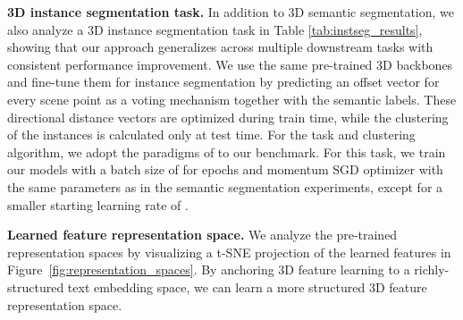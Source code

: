 \smallskip
\noindent \textbf{3D instance segmentation task.}
In addition to 3D semantic segmentation, we also analyze a 3D instance segmentation task in Table \ref{tab:instseg_results}, showing that our approach generalizes across multiple downstream tasks with consistent performance improvement.
We use the same pre-trained 3D backbones and fine-tune them for instance segmentation by predicting an offset vector for every scene point as a voting mechanism together with the semantic labels. These directional distance vectors are optimized during train time, while the clustering of the instances is calculated only at test time. For the task and clustering algorithm, we adopt the paradigms of  \cite{jiang2020pointgroup,scene_contrast} to our \OURS{} benchmark. For this task, we train our models with a batch size of  for  epochs and momentum SGD optimizer with the same parameters as in the semantic segmentation experiments, except for a smaller starting learning rate of .
\begin{table}
\centering
{}
\caption{3D instance segmentation, in comparison with training from scratch and state-of-the-art 3D pre-training approach CSC~\cite{scene_contrast}. Our language-grounded pre-training improves over both baselines.}
\label{tab:instseg_results}
\end{table}

\noindent \textbf{Learned feature representation space.}
We analyze the pre-trained representation spaces by visualizing a t-SNE projection of the learned features in Figure~\ref{fig:representation_spaces}.
By anchoring 3D feature learning to a richly-structured text embedding space, we can learn a more structured 3D feature representation space. 

